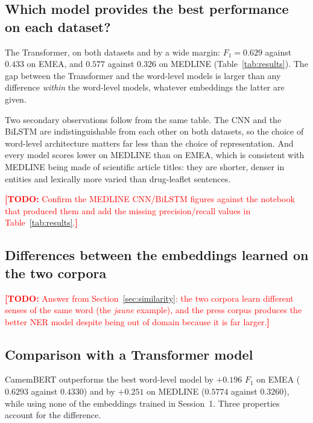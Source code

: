 \documentclass[11pt,a4paper]{article}
\newcommand{\TODO}[1]{\textcolor{red}{\textbf{[TODO:} #1\textbf{]}}}
\begin{document}
\subsection{Which model provides the best performance on each dataset?}
\label{sec:q1}

The Transformer, on both datasets and by a wide margin: $F_1=0.629$ against $0.433$ on EMEA,
and $0.577$ against $0.326$ on MEDLINE (Table~\ref{tab:results}). The gap between the
Transformer and the word-level models is larger than any difference \emph{within} the
word-level models, whatever embeddings the latter are given.

Two secondary observations follow from the same table. The CNN and the BiLSTM are
indistinguishable from each other on both datasets, so the choice of word-level architecture
matters far less than the choice of representation. And every model scores lower on MEDLINE
than on EMEA, which is consistent with MEDLINE being made of scientific article titles: they
are shorter, denser in entities and lexically more varied than drug-leaflet sentences.

\TODO{Confirm the MEDLINE CNN/BiLSTM figures against the notebook that produced them and add
the missing precision/recall values in Table~\ref{tab:results}.}

\subsection{Differences between the embeddings learned on the two corpora}
\label{sec:q2}

\TODO{Answer from Section~\ref{sec:similarity}: the two corpora learn different senses of the
same word (the \emph{jaune} example), and the press corpus produces the better NER model
despite being out of domain because it is far larger.}

\subsection{Comparison with a Transformer model}
\label{sec:q3}

CamemBERT outperforms the best word-level model by $+0.196$ $F_1$ on EMEA ($0.6293$ against
$0.4330$) and by $+0.251$ on MEDLINE ($0.5774$ against $0.3260$), while using none of the
embeddings trained in Session~1. Three properties account for the difference.
\end{document}
